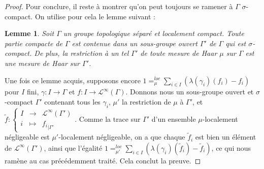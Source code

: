 \documentclass[a4paper,12pt]{article}
\newtheorem{lemma}[theorem]{Lemme}
\newcommand\fundef[3]{#1: \left\{\begin{array}{ccc}#2\\#3\end{array}\right.}
\begin{document}
\begin{proof}
    Pour conclure, il reste à montrer qu'on peut toujours se ramener à $\Gamma$ $\sigma$-compact. 
    On utilise pour cela le lemme suivant :
    \begin{lemma}\label{exists_sigma_compact_subgroup}
        Soit $\Gamma$ un groupe topologique séparé et localement compact. Toute partie compacte de $\Gamma$ est contenue dans un sous-groupe ouvert $\Gamma'$ de $\Gamma$ qui est $\sigma$-compact.
        De plus, la restriction à un tel $\Gamma'$ de toute mesure de Haar $\mu$ sur $\Gamma$
        est une mesure de Haar sur $\Gamma'$.
    \end{lemma}
    Une fois ce lemme acquis, supposons encore $1 =_\mu^{loc} \sum_{i\in I} (\lambda(\gamma_i)(f_i) - f_i)$ pour $I$ fini, $\gamma : I \to\Gamma$ et
    $f : I\to \mathscr{L}^\infty(\Gamma)$. Donnons nous un sous-groupe ouvert et $\sigma$-compact $\Gamma'$ contenant tous les $\gamma_i$, $\mu'$
    la restriction de $\mu$ à $\Gamma'$, et $\fundef{\widetilde{f}}{I&\to&\mathscr{L}^\infty(\Gamma')}{i&\mapsto&{f_i}_{|\Gamma'}}$.
    Comme la trace sur $\Gamma'$ d'un ensemble $\mu$-localement négligeable est $\mu'$-localement négligeable, on a 
    que chaque $\widetilde{f}_i$ est bien un élément de $\mathscr{L}^\infty(\Gamma')$, ainsi que 
    l'égalité $1 =_{\mu'}^{loc} \sum_{i\in I} (\lambda(\gamma_i)(\widetilde{f}_i) - \widetilde{f}_i)$, ce
    qui nous ramène au cas précédemment traité. Cela conclut la preuve.
\end{proof}
\end{document}

